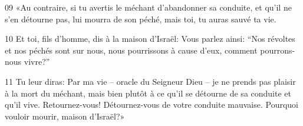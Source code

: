 
09 «Au contraire, si tu avertis le méchant d’abandonner sa conduite, et qu’il ne s’en détourne pas, lui mourra de son péché, mais toi, tu auras sauvé ta vie.

10 Et toi, fils d’homme, dis à la maison d’Israël: Vous parlez ainsi: “Nos révoltes et nos péchés sont sur nous, nous pourrissons à cause d’eux, comment pourrons-nous vivre?”

11 Tu leur diras: Par ma vie – oracle du Seigneur Dieu – je ne prends pas plaisir à la mort du méchant, mais bien plutôt à ce qu’il se détourne de sa conduite et qu’il vive. Retournez-vous! Détournez-vous de votre conduite mauvaise. Pourquoi vouloir mourir, maison d’Israël?»

